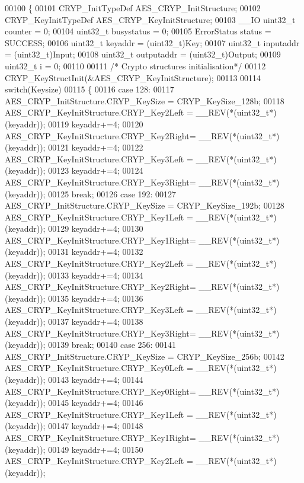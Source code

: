 \begin{DoxyCode}
00100 \{
00101   CRYP_InitTypeDef AES\_CRYP\_InitStructure;
00102   CRYP_KeyInitTypeDef AES\_CRYP\_KeyInitStructure;
00103   \_\_IO uint32\_t counter = 0;
00104   uint32\_t busystatus = 0;
00105   ErrorStatus status = SUCCESS;
00106   uint32\_t keyaddr    = (uint32\_t)Key;
00107   uint32\_t inputaddr  = (uint32\_t)Input;
00108   uint32\_t outputaddr = (uint32\_t)Output;
00109   uint32\_t i = 0;
00110 
00111   \textcolor{comment}{/* Crypto structures initialisation*/}
00112   CRYP_KeyStructInit(&AES\_CRYP\_KeyInitStructure);
00113 
00114   \textcolor{keywordflow}{switch}(Keysize)
00115   \{
00116     \textcolor{keywordflow}{case} 128:
00117     AES\_CRYP\_InitStructure.CRYP_KeySize = CRYP_KeySize_128b;
00118     AES\_CRYP\_KeyInitStructure.CRYP_Key2Left = \_\_REV(*(uint32\_t*)(keyaddr));
00119     keyaddr+=4;
00120     AES\_CRYP\_KeyInitStructure.CRYP_Key2Right= \_\_REV(*(uint32\_t*)(keyaddr));
00121     keyaddr+=4;
00122     AES\_CRYP\_KeyInitStructure.CRYP_Key3Left = \_\_REV(*(uint32\_t*)(keyaddr));
00123     keyaddr+=4;
00124     AES\_CRYP\_KeyInitStructure.CRYP_Key3Right= \_\_REV(*(uint32\_t*)(keyaddr));
00125     \textcolor{keywordflow}{break};
00126     \textcolor{keywordflow}{case} 192:
00127     AES\_CRYP\_InitStructure.CRYP_KeySize  = CRYP_KeySize_192b;
00128     AES\_CRYP\_KeyInitStructure.CRYP_Key1Left = \_\_REV(*(uint32\_t*)(keyaddr));
00129     keyaddr+=4;
00130     AES\_CRYP\_KeyInitStructure.CRYP_Key1Right= \_\_REV(*(uint32\_t*)(keyaddr));
00131     keyaddr+=4;
00132     AES\_CRYP\_KeyInitStructure.CRYP_Key2Left = \_\_REV(*(uint32\_t*)(keyaddr));
00133     keyaddr+=4;
00134     AES\_CRYP\_KeyInitStructure.CRYP_Key2Right= \_\_REV(*(uint32\_t*)(keyaddr));
00135     keyaddr+=4;
00136     AES\_CRYP\_KeyInitStructure.CRYP_Key3Left = \_\_REV(*(uint32\_t*)(keyaddr));
00137     keyaddr+=4;
00138     AES\_CRYP\_KeyInitStructure.CRYP_Key3Right= \_\_REV(*(uint32\_t*)(keyaddr));
00139     \textcolor{keywordflow}{break};
00140     \textcolor{keywordflow}{case} 256:
00141     AES\_CRYP\_InitStructure.CRYP_KeySize  = CRYP_KeySize_256b;
00142     AES\_CRYP\_KeyInitStructure.CRYP_Key0Left = \_\_REV(*(uint32\_t*)(keyaddr));
00143     keyaddr+=4;
00144     AES\_CRYP\_KeyInitStructure.CRYP_Key0Right= \_\_REV(*(uint32\_t*)(keyaddr));
00145     keyaddr+=4;
00146     AES\_CRYP\_KeyInitStructure.CRYP_Key1Left = \_\_REV(*(uint32\_t*)(keyaddr));
00147     keyaddr+=4;
00148     AES\_CRYP\_KeyInitStructure.CRYP_Key1Right= \_\_REV(*(uint32\_t*)(keyaddr));
00149     keyaddr+=4;
00150     AES\_CRYP\_KeyInitStructure.CRYP_Key2Left = \_\_REV(*(uint32\_t*)(keyaddr));

\end{DoxyCode}
